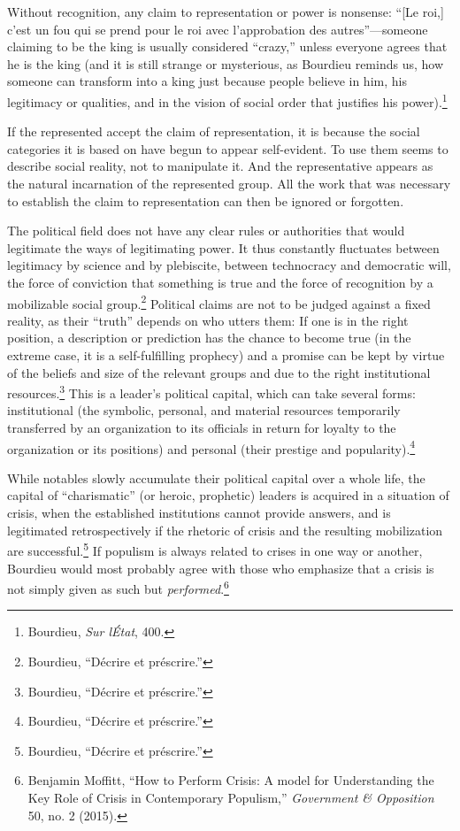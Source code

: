 \documentclass{tufte-handout}
\begin{document}
Without recognition, any claim to representation or power is nonsense:
``{[}Le roi,{]} c'est un fou qui se prend pour le roi avec l'approbation
des autres''---someone claiming to be the king is usually considered
``crazy,'' unless everyone agrees that he is the king (and it is still
strange or mysterious, as Bourdieu reminds us, how someone can transform
into a king just because people believe in him, his legitimacy or
qualities, and in the vision of social order that justifies his
power).\footnote{Bourdieu, \emph{Sur l\textquotesingle État}, 400.}

If the represented accept the claim of representation, it is because the
social categories it is based on have begun to appear self-evident. To
use them seems to describe social reality, not to manipulate it. And the
representative appears as the natural incarnation of the represented
group. All the work that was necessary to establish the claim to
representation can then be ignored or forgotten.

The political field does not have any clear rules or authorities that
would legitimate the ways of legitimating power. It thus constantly
fluctuates between legitimacy by science and by plebiscite, between
technocracy and democratic will, the force of conviction that something
is true and the force of recognition by a mobilizable social
group.\footnote{Bourdieu, ``Décrire et préscrire.''} Political claims
are not to be judged against a fixed reality, as their ``truth'' depends
on who utters them: If one is in the right position, a description or
prediction has the chance to become true (in the extreme case, it is a
self-fulfilling prophecy) and a promise can be kept by virtue of the
beliefs and size of the relevant groups and due to the right
institutional resources.\footnote{Bourdieu, ``Décrire et préscrire.''}
This is a leader's political capital, which can take several forms:
institutional (the symbolic, personal, and material resources
temporarily transferred by an organization to its officials in return
for loyalty to the organization or its positions) and personal (their
prestige and popularity).\footnote{Bourdieu, ``Décrire et préscrire.''}

While notables slowly accumulate their political capital over a whole
life, the capital of ``charismatic'' (or heroic, prophetic) leaders is
acquired in a situation of crisis, when the established institutions
cannot provide answers, and is legitimated retrospectively if the
rhetoric of crisis and the resulting mobilization are
successful.\footnote{Bourdieu, ``Décrire et préscrire.''} If populism is
always related to crises in one way or another, Bourdieu would most
probably agree with those who emphasize that a crisis is not simply
given as such but \emph{performed}.\footnote{Benjamin Moffitt, ``How to
  Perform Crisis: A model for Understanding the Key Role of Crisis in
  Contemporary Populism,'' \emph{Government \& Opposition} 50, no. 2
  (2015).}
\end{document}
